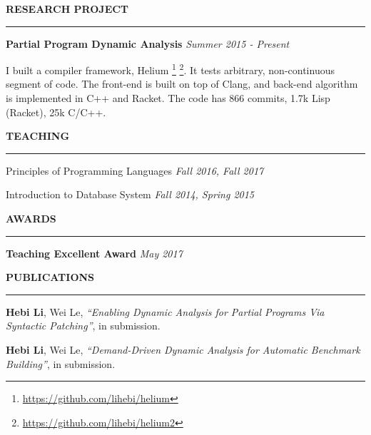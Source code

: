 \documentclass[10pt,letterpaper]{article}
\newenvironment{rSection}[1]{ %
  \sectionskip
  \MakeUppercase{\bf #1} %
  \sectionlineskip
  \hrule %
  \begin{list}{}{ %
      \setlength{\leftmargin}{1.5em} %
    }
  \item[]
}{
  \end{list}
}
\def\sectionlineskip{\medskip} %
\def\sectionskip{\medskip} %
\begin{document}
\begin{rSection}{Research Project}
  \textbf{Partial Program Dynamic Analysis} \hfill \emph{Summer 2015 -
    Present}

  I built a compiler framework,
  Helium \footnote{\url{https://github.com/lihebi/helium}}
  \footnote{\url{https://github.com/lihebi/helium2}}. It tests
  arbitrary, non-continuous segment of code. The front-end is built on
  top of Clang, and back-end algorithm is implemented in C++ and
  Racket.  The code has 866 commits, 1.7k Lisp (Racket), 25k C/C++.


\end{rSection}

\begin{rSection}{Teaching}
  Principles of Programming Languages \hfill \emph{Fall 2016, Fall 2017}

  Introduction to Database System \hfill \emph{Fall 2014, Spring 2015}
\end{rSection}

\begin{rSection}{Awards}
  \textbf{Teaching Excellent Award} \hfill \emph{May 2017}
\end{rSection}



\begin{rSection}{Publications}
  \textbf{Hebi Li}, Wei Le, \textit{``Enabling Dynamic Analysis for
    Partial Programs Via Syntactic Patching''}, in submission.

  \textbf{Hebi Li}, Wei Le, \textit{``Demand-Driven Dynamic Analysis
    for Automatic Benchmark Building''}, in submission.
\end{rSection}
\end{document}

